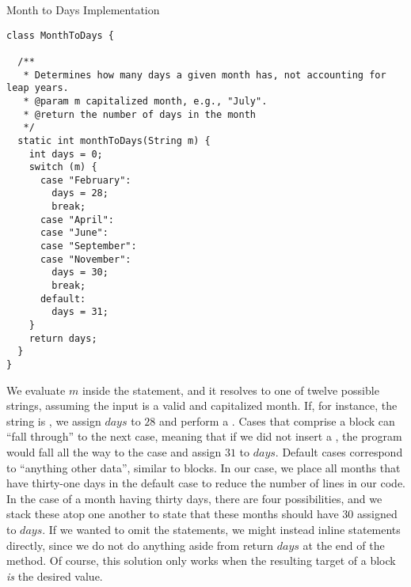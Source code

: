 \begin{cl}[]{Month to Days Implementation}
\begin{lstlisting}[language=MyJava]
class MonthToDays {

  /**
   * Determines how many days a given month has, not accounting for leap years.
   * @param m capitalized month, e.g., "July".
   * @return the number of days in the month
   */
  static int monthToDays(String m) {
    int days = 0;
    switch (m) {
      case "February":
        days = 28;
        break;
      case "April":
      case "June":
      case "September":
      case "November":
        days = 30;
        break;
      default:
        days = 31;
    }
    return days;
  }
}
\end{lstlisting}
\end{cl}

We evaluate $m$ inside the  statement, and it resolves to one of twelve possible strings, assuming the input is a valid and capitalized month. If, for instance, the string is , we assign $\mathit{days}$ to $28$ and perform a . Cases that comprise a  block can ``fall through'' to the next case, meaning that if we did not insert a , the program would fall all the way to the  case and assign $31$ to $\mathit{days}$. Default cases correspond to ``anything other data'', similar to  blocks. In our case, we place all months that have thirty-one days in the default case to reduce the number of lines in our code. In the case of a month having thirty days, there are four possibilities, and we stack these atop one another to state that these months should have $30$ assigned to $\mathit{days}$. If we wanted to omit the  statements, we might instead inline  statements directly, since we do not do anything aside from return $\mathit{days}$ at the end of the method. Of course, this solution only works when the resulting target of a  block \textit{is} the desired value.
